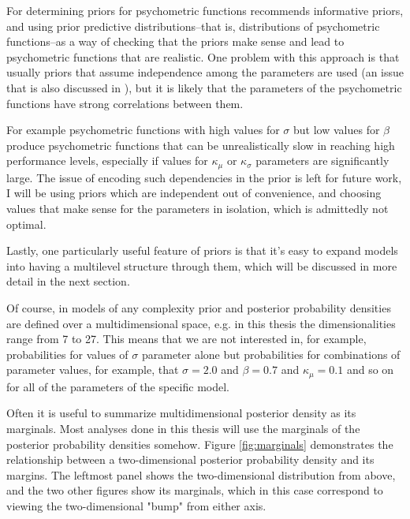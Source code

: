 \documentclass{article}\usepackage{knitr}
\begin{document}
For determining priors for psychometric functions \citet{lee2018} recommends informative priors, and using prior predictive distributions--that is, distributions of psychometric functions--as a way of checking that the priors make sense and lead to psychometric functions that are realistic. One problem with this approach is that usually priors that assume independence among the parameters are used (an issue that is also discussed in \citet{prior_choice_recommendations}), but it is likely that the parameters of the psychometric functions have strong correlations between them. 

For example psychometric functions with high values for $\sigma$ but low values for $\beta$ produce psychometric functions that can be unrealistically slow in reaching high performance levels, especially if values for $\kappa_{\mu}$ or $\kappa_{\sigma}$ parameters are significantly large. The issue of encoding such dependencies in the prior is left for future work, I will be using priors which are independent out of convenience, and choosing values that make sense for the parameters in isolation, which is admittedly not optimal.  

Lastly, one particularly useful feature of priors is that it's easy to expand models into having a multilevel structure through them, which will be discussed in more detail in the next section.  

Of course, in models of any complexity prior and posterior probability densities are defined over a multidimensional space, e.g. in this thesis the dimensionalities range from 7 to 27. This means that we are not interested in, for example, probabilities for values of $\sigma$ parameter alone but probabilities for combinations of parameter values, for example, that $\sigma = 2.0$ and $\beta = 0.7$ and $\kappa_{\mu} = 0.1$ and so on for all of the parameters of the specific model.

Often it is useful to summarize multidimensional posterior density as its marginals. Most analyses done in this thesis will use the marginals of  the posterior probability densities somehow. Figure \ref{fig:marginals} demonstrates the relationship between a two-dimensional posterior probability density and its margins. The leftmost panel shows the two-dimensional distribution from above, and the two other figures show its marginals, which in this case correspond to viewing the two-dimensional "bump" from either axis. 
\end{document}
